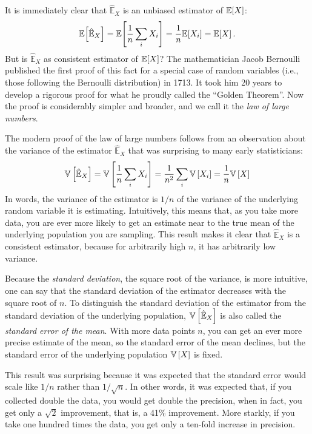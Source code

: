 It is immediately clear that $\hat{\mathbb{E}}_X$ is an unbiased estimator of $\mathbb{E}\!\left[{X}\right]$:
\begin{equation*}
    \mathbb{E}\!\left[{\hat{\mathbb{E}}_X}\right] = \mathbb{E}\!\left[{\frac{1}{n} \sum_i X_i}\right] = \frac{1}{n} \mathbb{E}\!\left[{X_i}\right] = \mathbb{E}\!\left[{X}\right].
\end{equation*}
But is $\hat{\mathbb{E}}_X$ as consistent estimator of $\mathbb{E}\!\left[{X}\right]$? The mathematician Jacob Bernoulli published the first proof of this fact for a special case of random variables (i.e., those following the Bernoulli distribution) in 1713. It took him 20 years to develop a rigorous proof for what he proudly called the ``Golden Theorem''. Now the proof is considerably simpler and broader, and we call it the \emph{law of large numbers}.

The modern proof of the law of large numbers follows from an observation about the variance of the estimator $\hat{\mathbb{E}}_X$ that was surprising to many early statisticians:
\begin{equation*}
    \mathbb{V}\left[{\hat{\mathbb{E}}_X}\right] = \mathbb{V}\left[{\frac{1}{n} \sum_i X_i}\right] = \frac{1}{n^2} \sum_i \mathbb{V}\left[{X_i}\right] = \frac{1}{n} \mathbb{V}\left[{X}\right]
\end{equation*}
In words, the variance of the estimator is $1/n$ of the variance of the underlying random variable it is estimating. Intuitively, this means that, as you take more data, you are ever more likely to get an estimate near to the true mean of the underlying population you are sampling. This result makes it clear that $\hat{\mathbb{E}}_X$ is a consistent estimator, because for arbitrarily high $n$, it has arbitrarily low variance.

Because the \emph{standard deviation}, the square root of the variance, is more intuitive, one can say that the standard deviation of the estimator decreases with the square root of $n$. To distinguish the standard deviation of the estimator from the standard deviation of the underlying population, $\mathbb{V}\left[{\hat{\mathbb{E}}_X}\right]$ is also called the \emph{standard error of the mean}. With more data points $n$, you can get an ever more precise estimate of the mean, so the standard error of the mean declines, but the standard error of the underlying population $\mathbb{V}\left[{X}\right]$ is fixed.

This result was surprising because it was expected that the standard error would scale like $1/n$ rather than $1/\sqrt{n}$. In other words, it was expected that, if you collected double the data, you would get double the precision, when in fact, you get only a $\sqrt{2}$ improvement, that is, a 41\% improvement. More starkly, if you take one hundred times the data, you get only a ten-fold increase in precision.
